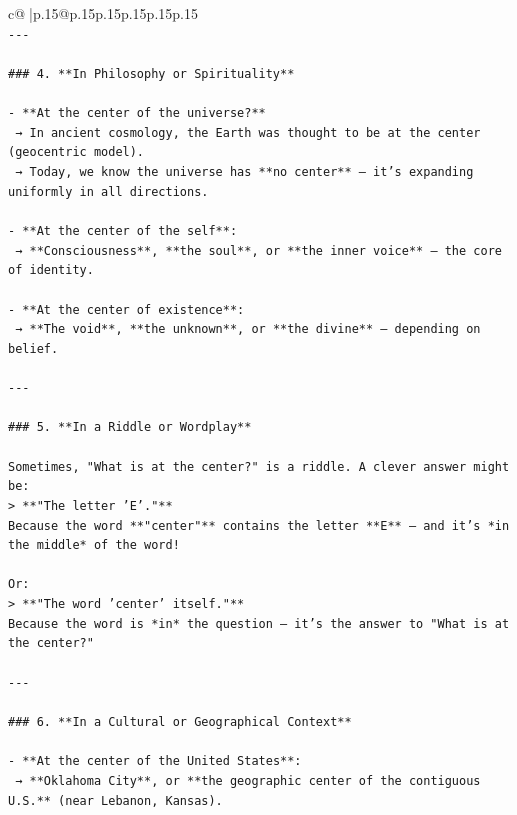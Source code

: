 \documentclass{article}
\begin{document}
{\begin{supertabular}{c@{$\;$}|p{.15\linewidth}@{}p{.15\linewidth}p{.15\linewidth}p{.15\linewidth}p{.15\linewidth}p{.15\linewidth}}
{{{\\ 
\texttt{{-}{-}{-}} \\
\\ 
\texttt{\#\#\# 4. **In Philosophy or Spirituality**} \\
\\ 
\texttt{{-} **At the center of the universe?**  } \\
\texttt{  → In ancient cosmology, the Earth was thought to be at the center (geocentric model).  } \\
\texttt{  → Today, we know the universe has **no center** — it’s expanding uniformly in all directions.} \\
\\ 
\texttt{{-} **At the center of the self**:  } \\
\texttt{  → **Consciousness**, **the soul**, or **the inner voice** — the core of identity.} \\
\\ 
\texttt{{-} **At the center of existence**:  } \\
\texttt{  → **The void**, **the unknown**, or **the divine** — depending on belief.} \\
\\ 
\texttt{{-}{-}{-}} \\
\\ 
\texttt{\#\#\# 5. **In a Riddle or Wordplay**} \\
\\ 
\texttt{Sometimes, "What is at the center?" is a riddle. A clever answer might be:} \\
\texttt{> **"The letter 'E'."**  } \\
\texttt{Because the word **"center"** contains the letter **E** — and it’s *in the middle* of the word!} \\
\\ 
\texttt{Or:} \\
\texttt{> **"The word 'center' itself."**  } \\
\texttt{Because the word is *in* the question — it’s the answer to "What is at the center?"} \\
\\ 
\texttt{{-}{-}{-}} \\
\\ 
\texttt{\#\#\# 6. **In a Cultural or Geographical Context**} \\
\\ 
\texttt{{-} **At the center of the United States**:  } \\
\texttt{  → **Oklahoma City**, or **the geographic center of the contiguous U.S.** (near Lebanon, Kansas).} \\
}}}
\end{supertabular}}
\end{document}
